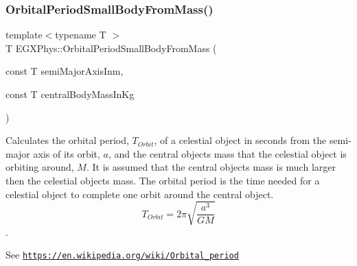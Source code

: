 \subsubsection{\texorpdfstring{Orbital\+Period\+Small\+Body\+From\+Mass()}{OrbitalPeriodSmallBodyFromMass()}}
{\footnotesize\ttfamily template$<$typename T $>$ \\
T E\+G\+X\+Phys\+::\+Orbital\+Period\+Small\+Body\+From\+Mass (\begin{DoxyParamCaption}\item[{const T}]{semi\+Major\+Axis\+Inm,  }\item[{const T}]{central\+Body\+Mass\+In\+Kg }\end{DoxyParamCaption})}



Calculates the orbital period, $T_{Orbit}$, of a celestial object in seconds from the semi-\/major axis of its orbit, $a$, and the central object\textquotesingle{}s mass that the celestial object is orbiting around, $M$. It is assumed that the central object\textquotesingle{}s mass is much larger then the celestial objects mass. The orbital period is the time needed for a celestial object to complete one orbit around the central object. \[ T_{Orbit}=2\pi\sqrt{\dfrac{a^3}{GM}}\]. 

See \href{https://en.wikipedia.org/wiki/Orbital_period}{\tt https\+://en.\+wikipedia.\+org/wiki/\+Orbital\+\_\+period}


